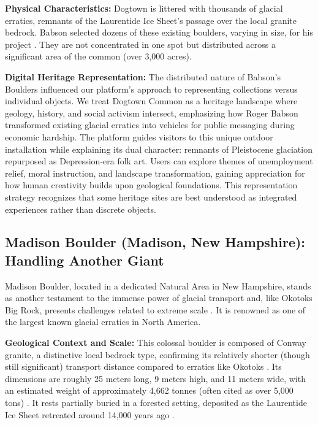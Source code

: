 \textbf{Physical Characteristics:} Dogtown is littered with thousands of glacial erratics, remnants of the Laurentide Ice Sheet's passage over the local granite bedrock. Babson selected dozens of these existing boulders, varying in size, for his project \cite{wburMysteriousBoulders}. They are not concentrated in one spot but distributed across a significant area of the common (over 3,000 acres).

\textbf{Digital Heritage Representation:} The distributed nature of Babson's Boulders influenced our platform's approach to representing collections versus individual objects. We treat Dogtown Common as a heritage landscape where geology, history, and social activism intersect, emphasizing how Roger Babson transformed existing glacial erratics into vehicles for public messaging during economic hardship. The platform guides visitors to this unique outdoor installation while explaining its dual character: remnants of Pleistocene glaciation repurposed as Depression-era folk art. Users can explore themes of unemployment relief, moral instruction, and landscape transformation, gaining appreciation for how human creativity builds upon geological foundations. This representation strategy recognizes that some heritage sites are best understood as integrated experiences rather than discrete objects.

\subsection{Madison Boulder (Madison, New Hampshire): Handling Another Giant}
\label{subsec:madison}

Madison Boulder, located in a dedicated Natural Area in New Hampshire, stands as another testament to the immense power of glacial transport and, like Okotoks Big Rock, presents challenges related to extreme scale \cite{Goldthwait1925, NHMadisonBoulder}. It is renowned as one of the largest known glacial erratics in North America.

\textbf{Geological Context and Scale:} This colossal boulder is composed of Conway granite, a distinctive local bedrock type, confirming its relatively shorter (though still significant) transport distance compared to erratics like Okotoks \cite{Goldthwait1925, NPSMadisonBoulder}. Its dimensions are roughly 25 meters long, 9 meters high, and 11 meters wide, with an estimated weight of approximately 4,662 tonnes (often cited as over 5,000 tons) \cite{NHMadisonBoulder, NPSMadisonBoulder}. It rests partially buried in a forested setting, deposited as the Laurentide Ice Sheet retreated around 14,000 years ago \cite{Goldthwait1925}.

